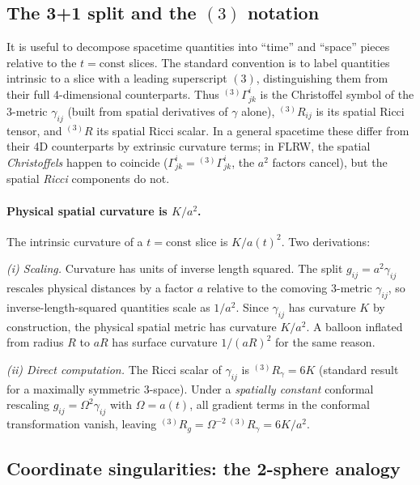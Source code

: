 \documentclass[12pt]{article}
\begin{document}
\subsection{The 3+1 split and the $(3)$ notation}
\label{app:3plus1}

It is useful to decompose spacetime quantities into ``time'' and
``space'' pieces relative to the $t=\mathrm{const}$ slices.  The
standard convention is to label quantities intrinsic to a slice with
a leading superscript $(3)$, distinguishing them from their full
4-dimensional counterparts.  Thus ${}^{(3)}\Gamma^i_{jk}$ is the
Christoffel symbol of the 3-metric $\gamma_{ij}$ (built from spatial
derivatives of $\gamma$ alone), ${}^{(3)}R_{ij}$ is its spatial Ricci
tensor, and ${}^{(3)}R$ its spatial Ricci scalar.  In a general
spacetime these differ from their 4D counterparts by extrinsic
curvature terms; in FLRW, the spatial \emph{Christoffels} happen to
coincide ($\Gamma^i_{jk} = {}^{(3)}\Gamma^i_{jk}$, the $a^2$ factors
cancel), but the spatial \emph{Ricci} components do not.

\paragraph{Physical spatial curvature is $K/a^2$.}
The intrinsic curvature of a $t=\mathrm{const}$ slice is
$K/a(t)^2$.  Two derivations:

\emph{(i) Scaling.}  Curvature has units of inverse length squared.
The split $g_{ij} = a^2\gamma_{ij}$ rescales physical distances by a
factor $a$ relative to the comoving 3-metric $\gamma_{ij}$, so
inverse-length-squared quantities scale as $1/a^2$.  Since
$\gamma_{ij}$ has curvature $K$ by construction, the physical spatial
metric has curvature $K/a^2$.  A balloon inflated from radius $R$ to
$aR$ has surface curvature $1/(aR)^2$ for the same reason.

\emph{(ii) Direct computation.}  The Ricci scalar of $\gamma_{ij}$ is
${}^{(3)}R_\gamma = 6K$ (standard result for a maximally symmetric
3-space).  Under a \emph{spatially constant} conformal rescaling
$g_{ij} = \Omega^2\gamma_{ij}$ with $\Omega=a(t)$, all gradient terms
in the conformal transformation vanish, leaving
${}^{(3)}R_g = \Omega^{-2}\,{}^{(3)}R_\gamma = 6K/a^2$.

\subsection{Coordinate singularities: the 2-sphere analogy}
\label{app:coord_sing}
\end{document}
